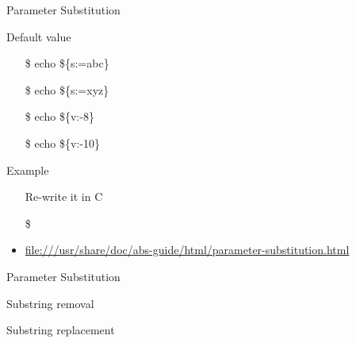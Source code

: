 \begin{frame}{Parameter Substitution}
  \begin{block}{Default value}\ttfamily
    \begin{multicols}{2}
      \begin{itemize}
      \item[\$] echo \$\{s:=abc\}
      \item[\$] echo \$\{s:=xyz\}
      \item[\$] echo \$\{v:-8\}
      \item[\$] echo \$\{v:-10\}
      \end{itemize}
    \end{multicols}
  \end{block}
  \begin{block}{Example}
    \begin{center}
    \end{center}
  \end{block}
  \begin{itemize}
  \item[\hw] Re-write it in C
  \end{itemize}
\end{frame}
\begin{itemize}
\item[\$] 
\item \url{file:///usr/share/doc/abs-guide/html/parameter-substitution.html}
\end{itemize}

\begin{frame}{Parameter Substitution}
  \begin{block}{Substring removal}
  \end{block}
  \begin{block}{Substring replacement}
  \end{block}  
\end{frame}

